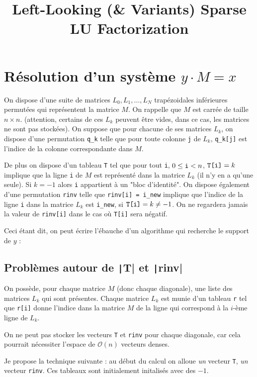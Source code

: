 \documentclass{article}
\begin{document}
\title{ Left-Looking (\& Variants) Sparse LU Factorization}
\maketitle


\section{Résolution d'un système $y \cdot M = x$}
On dispose d'une suite de matrices $L_0, L_1, \ldots, L_N$
trapézoidales inférieures permutées qui représentent la matrice
$M$. On rappelle que $M$ est carrée de taille $n \times n$.
(attention, certains de ces $L_k$ peuvent être vides, dans ce cas, les
matrices ne sont pas stockées). On suppose que pour chacune de ses
matrices $L_k$, on dispose d'une permutation \verb$q_k$ telle que pour
toute colonne \verb$j$ de $L_k$, \verb$q_k[j]$ est l'indice de la
colonne correspondante dans $M$.

De plus on dispose d'un tableau \verb$T$ tel que pour tout \verb$i$,
$0 \leq \verb|i| < n$, $\verb|T[i]| = k$ implique que la ligne
\verb$i$ de $M$ est représenté dans la matrice $L_k$ (il n'y en a
qu'une seule). Si $k = -1$ alors \verb$i$ appartient à un "bloc
d'identité". On dispose également d'une permutation \verb$rinv$ telle
que \verb$rinv[i] = i_new$ implique que l'indice de la ligne \verb$i$
dans la matrice $L_k$ est \verb$i_new$, si $\verb|T[i]| = k \not= -1$.
On ne regardera jamais la valeur de \verb$rinv[i]$ dans le cas où
\verb$T[i]$ sera négatif.

Ceci étant dit, on peut écrire l'ébauche d'un algorithme qui recherche
le support de $y$ :

\subsection{Problèmes autour de \texttt|T| et \texttt|rinv|}

On possède, pour chaque matrice $M$ (donc chaque diagonale), une liste
des matrices $L_k$ qui sont présentes. Chaque matrice $L_k$ est munie
d'un tableau \verb|r| tel que \verb|r[i]| donne l'indice dans la
matrice $M$ de la ligne qui correspond à la $i$-ème ligne de $L_k$.

On ne peut pas stocker les vecteurs  \verb|T| et \verb|rinv| pour
chaque diagonale, car cela pourrait nécessiter l'espace de
$\mathcal{O}(n)$ vecteurs denses.

Je propose la technique suivante : au début du calcul on alloue
\emph{un} vecteur  \verb|T|, \emph{un} vecteur \verb|rinv|. Ces
tableaux sont initialement initalisés avec des $-1$.
\end{document}
